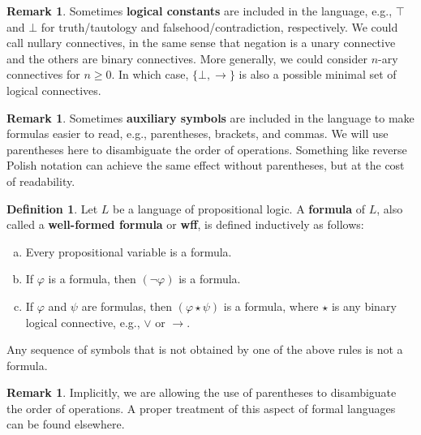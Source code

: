\documentclass[12pt]{article}
\theoremstyle{definition}
\newtheorem{definition}[theorem]{Definition}
\newtheorem{remark}[theorem]{Remark}
\renewcommand{\phi}{\varphi}
\newcommand{\<}{\langle}
\renewcommand{\>}{\rangle}
\newcommand{\keyword}{\textbf}
\begin{document}
\begin{remark}
    Sometimes \keyword{logical constants} are included in the language, e.g., $\top$ and $\bot$ for truth/tautology and falsehood/contradiction, respectively.
    We could call nullary connectives, in the same sense that negation is a unary connective and the others are binary connectives.
    More generally, we could consider $n$-ary connectives for $n \geq 0$.
    In which case, $\{\bot, \to\}$ is also a possible minimal set of logical connectives.
\end{remark}

\begin{remark}
    Sometimes \keyword{auxiliary symbols} are included in the language to make formulas easier to read, e.g., parentheses, brackets, and commas.
    We will use parentheses here to disambiguate the order of operations.
    Something like reverse Polish notation can achieve the same effect without parentheses, but at the cost of readability.
\end{remark}



\begin{definition}
    Let $L$ be a language of propositional logic.
    A \keyword{formula} of $L$, also called a \keyword{well-formed formula} or \keyword{wff}, is defined inductively as follows:
    \begin{enumerate}[(a)]
        \item Every propositional variable is a formula.
        \item If $\phi$ is a formula, then $(\lnot\phi)$ is a formula.
        \item If $\phi$ and $\psi$ are formulas, then $(\phi \star \psi)$ is a formula, where $\star$ is any binary logical connective, e.g., $\lor$ or $\to$.
    \end{enumerate}
    Any sequence of symbols that is not obtained by one of the above rules is not a formula.
\end{definition}

\begin{remark}
    Implicitly, we are allowing the use of parentheses to disambiguate the order of operations.
    A proper treatment of this aspect of formal languages can be found elsewhere.
\end{remark}
\end{document}
